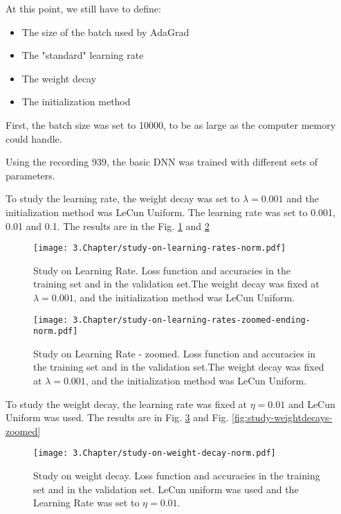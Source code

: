 At this point, we still have to define:
\begin{itemize}
\item The size of the batch used by AdaGrad
\item The "standard" learning rate
\item The weight decay
\item The initialization method
\end{itemize}

First, the batch size was set to 10000, to be as large as the computer memory could handle.

Using the recording 939, the basic DNN was trained with different sets of parameters. 


To study the learning rate, the weight decay was set to $\lambda = 0.001$ and the initialization method was LeCun Uniform. The learning rate was set to 0.001, 0.01 and 0.1. The results are in the Fig. \ref{fig:study-LR} and \ref{fig:study-LR-zoomed}

\begin{figure}[htbp]
	\centering
	\texttt{[image: 3.Chapter/study-on-learning-rates-norm.pdf]}
	\caption{Study on Learning Rate. Loss function and accuracies in the training set and in the validation set.The weight decay was fixed at $\lambda = 0.001$, and the initialization method was LeCun Uniform.
}
\label{fig:study-LR}
\end{figure}

\begin{figure}[htbp]
	\centering
	\texttt{[image: 3.Chapter/study-on-learning-rates-zoomed-ending-norm.pdf]}
	\caption{Study on Learning Rate - zoomed. Loss function and accuracies in the training set and in the validation set.The weight decay was fixed at $\lambda = 0.001$, and the initialization method was LeCun Uniform.
}
\label{fig:study-LR-zoomed}
\end{figure}

To study the weight decay, the learning rate was fixed at $\eta = 0.01$ and LeCun Uniform was used. The results are in Fig. \ref{fig:study-weightdecays} and Fig. \ref{fig:study-weightdecays-zoomed}

\begin{figure}[htbp]
	\centering
	\texttt{[image: 3.Chapter/study-on-weight-decay-norm.pdf]}
	\caption{Study on weight decay. Loss function and accuracies in the training set and in the validation set. LeCun uniform was used and the Learning Rate was set to $\eta = 0.01$.
}
\label{fig:study-weightdecays}
\end{figure}

